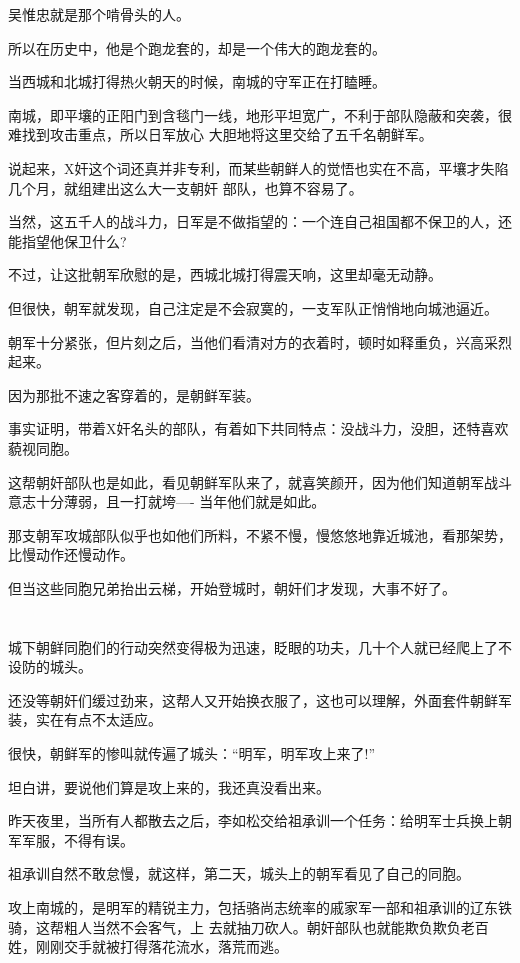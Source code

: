 \documentclass[11pt,a4paper,onecolumn]{article}
\begin{document}
吴惟忠就是那个啃骨头的人。

所以在历史中，他是个跑龙套的，却是一个伟大的跑龙套的。

当西城和北城打得热火朝天的时候，南城的守军正在打瞌睡。

南城，即平壤的正阳门到含毯门一线，地形平坦宽广，不利于部队隐蔽和突袭，很难找到攻击重点，所以日军放心
大胆地将这里交给了五千名朝鲜军。

说起来，X奸这个词还真并非专利，而某些朝鲜人的觉悟也实在不高，平壤才失陷几个月，就组建出这么大一支朝奸
部队，也算不容易了。

当然，这五千人的战斗力，日军是不做指望的：一个连自己祖国都不保卫的人，还能指望他保卫什么?

不过，让这批朝军欣慰的是，西城北城打得震天响，这里却毫无动静。

但很快，朝军就发现，自己注定是不会寂寞的，一支军队正悄悄地向城池逼近。

朝军十分紧张，但片刻之后，当他们看清对方的衣着时，顿时如释重负，兴高采烈起来。

因为那批不速之客穿着的，是朝鲜军装。

事实证明，带着X奸名头的部队，有着如下共同特点：没战斗力，没胆，还特喜欢藐视同胞。

这帮朝奸部队也是如此，看见朝鲜军队来了，就喜笑颜开，因为他们知道朝军战斗意志十分薄弱，且一打就垮----
当年他们就是如此。

那支朝军攻城部队似乎也如他们所料，不紧不慢，慢悠悠地靠近城池，看那架势，比慢动作还慢动作。

但当这些同胞兄弟抬出云梯，开始登城时，朝奸们才发现，大事不好了。

\section[\thesection]{}

城下朝鲜同胞们的行动突然变得极为迅速，眨眼的功夫，几十个人就已经爬上了不设防的城头。

还没等朝奸们缓过劲来，这帮人又开始换衣服了，这也可以理解，外面套件朝鲜军装，实在有点不太适应。

很快，朝鲜军的惨叫就传遍了城头：``明军，明军攻上来了!''

坦白讲，要说他们算是攻上来的，我还真没看出来。

昨天夜里，当所有人都散去之后，李如松交给祖承训一个任务：给明军士兵换上朝军军服，不得有误。

祖承训自然不敢怠慢，就这样，第二天，城头上的朝军看见了自己的同胞。

攻上南城的，是明军的精锐主力，包括骆尚志统率的戚家军一部和祖承训的辽东铁骑，这帮粗人当然不会客气，上
去就抽刀砍人。朝奸部队也就能欺负欺负老百姓，刚刚交手就被打得落花流水，落荒而逃。
\end{document}
